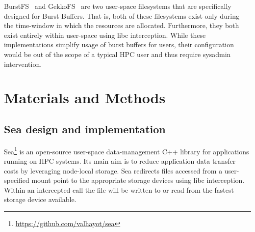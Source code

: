       BurstFS~\cite{burstfs} and GekkoFS~\cite{gekkofs} are two user-space
      filesystems that are specifically designed for Burst Buffers. That is,
      both of these filesystems exist only during the time-window in which the
      resources are allocated. Furthermore, they both exist entirely within
      user-space using libc interception. While these implementations simplify
      usage of burst buffers for users, their configuration would be out of the
      scope of a typical HPC user and thus require sysadmin intervention.

\section{Materials and Methods}

\subsection{Sea design and implementation}

Sea\footnote{\url{https://github.com/valhayot/sea}} is an open-source user-space data-management C++ library for applications running on HPC
systems. Its main aim is to reduce application data transfer costs by leveraging
node-local storage. Sea redirects files accessed from a user-specified mount
point to the appropriate storage devices using libc interception. Within an
intercepted call the file will be written to or read from the fastest storage
device available. 


